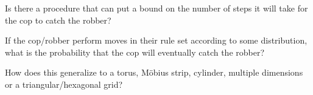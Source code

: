 \documentclass{article}
\begin{document}
\begin{related}
  \item Is there a procedure that can put a bound on the number of steps it will
    take for the cop to catch the robber?
  \item If the cop/robber perform moves in their rule set according to some
    distribution, what is the probability that the cop will eventually catch the
    robber?
  \item How does this generalize to a torus, M\"obius strip, cylinder, multiple
    dimensions or a triangular/hexagonal grid?
\end{related}
\end{document}
